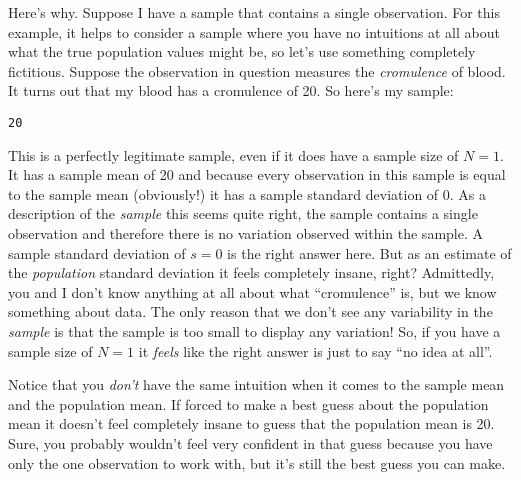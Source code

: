 Here's why. Suppose I have a sample that contains a single observation. For this example, it helps to consider a sample where you have no intuitions at all about what the true population values might be, so let's use something completely fictitious. Suppose the observation in question measures the {\it cromulence} of blood. It turns out that my blood has a cromulence of 20. So here's my sample:
\begin{center}
\texttt{20}
\end{center}
This is a perfectly legitimate sample, even if it does have a sample size of $N=1$. It has a sample mean of 20 and because every observation in this sample is equal to the sample mean (obviously!) it has a sample standard deviation of 0. As a description of the {\it sample} this seems quite right, the sample contains a single observation and therefore there is no variation observed within the sample. A sample standard deviation of $s = 0$ is the right answer here. But as an estimate of the {\it population} standard deviation it feels completely insane, right? Admittedly, you and I don't know anything at all about what ``cromulence'' is, but we know something about data. The only reason that we don't see any variability in the {\it sample} is that the sample is too small to display any variation! So, if you have a sample size of $N=1$ it {\it feels} like the right answer is just to say ``no idea at all''. 

Notice that you {\it don't} have the same intuition when it comes to the sample mean and the population mean. If forced to make a best guess about the population mean it doesn't feel completely insane to guess that the population mean is 20. Sure, you probably wouldn't feel very confident in that guess because you have only the one observation to work with, but it's still the best guess you can make. 

